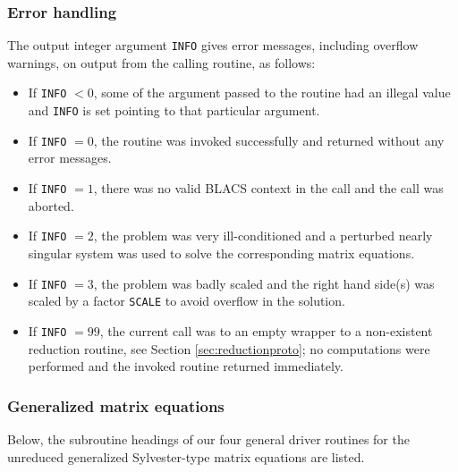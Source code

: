 \documentclass[11pt]{article}
\begin{document}
\subsubsection{Error handling}
The output integer argument \texttt{INFO} gives error messages,
including overflow warnings, on output from the calling routine,
as follows:
%
\begin{itemize}
    \item If \texttt{INFO} $ < 0$, some of the argument passed to
    the routine had an illegal value and \texttt{INFO} is set pointing
    to that particular argument.
    \item If \texttt{INFO} $ = 0$, the routine was invoked successfully
    and returned without any error messages.
    \item If \texttt{INFO} $ = 1$, there was no valid BLACS
    context \cite{blacs} in the call and the call was aborted.
    \item If \texttt{INFO} $ = 2$, the problem was very
    ill-conditioned and a perturbed nearly singular system
    was used to solve the corresponding matrix equations.
    \item If \texttt{INFO} $ = 3$, the problem was badly scaled
    and the right hand side(s) was scaled by a factor \texttt{SCALE} to
    avoid overflow in the solution.
    \item If \texttt{INFO} $ = 99$, the current call was to an
    empty wrapper to a non-existent reduction routine, see Section \ref{sec:reductionproto}; no
    computations were performed and the invoked routine returned
    immediately.
\end{itemize}

\subsubsection{Generalized matrix equations}
Below, the subroutine headings of our four general driver routines
for the unreduced generalized Sylvester-type matrix equations are
listed.
\end{document}
